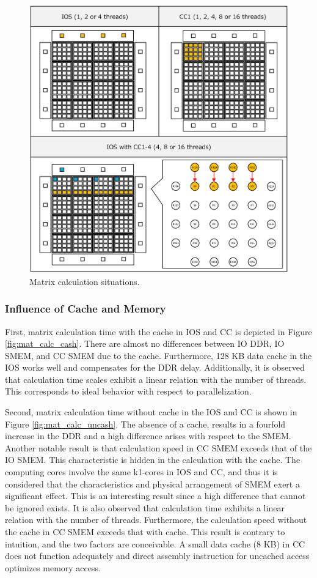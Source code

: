\documentclass{sig-alternate-05-2015}
\begin{document}
\begin{figure}[t]
  \centering
  \includegraphics[width=1.0\linewidth]{../figure/matrix_calculation.eps}
  \caption{\label{fig:mat_calc}
    Matrix calculation situations.}
\end{figure}

\subsubsection{Influence of Cache and Memory}
\label{sec:cache_and_memory}
First, matrix calculation time with the cache in IOS and CC is depicted in Figure \ref{fig:mat_calc_cash}.
There are almost no differences between IO DDR, IO SMEM, and CC SMEM due to the cache.
Furthermore, 128 KB data cache in the IOS works well and compensates for the DDR delay.
Additionally, it is observed that calculation time scales exhibit a linear relation with the number of threads.
This corresponds to ideal behavior with respect to parallelization.

Second, matrix calculation time without cache in the IOS and CC is shown in Figure \ref{fig:mat_calc_uncash}.
The absence of a cache, results in a fourfold increase in the DDR and a high difference arises with respect to the SMEM.
Another notable result is that calculation speed in CC SMEM exceeds that of the IO SMEM.
This characteristic is hidden in the calculation with the cache.
The computing cores involve the same k1-cores in IOS and CC, and thus it is considered that the characteristics and physical arrangement of SMEM exert a significant effect.
This is an interesting result since a high difference that cannot be ignored exists.
It is also observed that calculation time exhibits a linear relation with the number of threads.
Furthermore, the calculation speed without the cache in CC SMEM exceeds that with cache.
This result is contrary to intuition, and the two factors are conceivable.
A small data cache (8 KB) in CC does not function adequately and direct assembly instruction for uncached access optimizes memory access.
\end{document}
